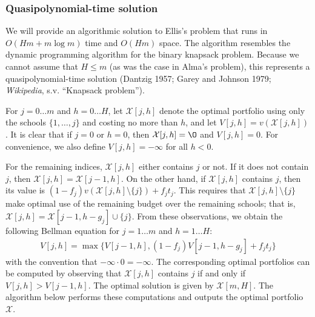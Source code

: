 \documentclass[12pt]{article} %
\theoremstyle{definition}
\theoremstyle{definition}
\begin{document}
\subsubsection{Quasipolynomial-time solution}
We will provide an algorithmic solution to Ellis's problem that runs in $O(Hm + m\log m)$ time and $O(Hm)$ space. The algorithm resembles the dynamic programming algorithm for the binary knapsack problem. Because we cannot assume that $H \leq m$ (as was the case in Alma's problem), this represents a quasipolynomial-time solution (Dantzig 1957; Garey and Johnson 1979; \emph{Wikipedia}, s.v. ``Knapsack problem'').

For $j = 0 \dots m$ and $h = 0 \dots H$, let $\mathcal{X}[j, h]$ denote the optimal portfolio using only the schools $\{ 1, \dots, j\}$ and costing no more than $h$, and let $V[j,h] = v(\mathcal{X}[j, h])$.  It is clear that if $j=0$ or $h=0$, then $\mathcal{X}[j, h] = \O$ and $V[j, h] = 0$.  For convenience, we also define $V[j, h] = -\infty$ for all $h < 0$.

For the remaining indices, $\mathcal{X}[j, h]$ either contains $j$ or not. If it does not contain $j$, then $\mathcal{X}[j, h] = \mathcal{X}[j-1, h]$. On the other hand, if  $\mathcal{X}[j, h]$ contains $j$, then its value is $(1 - f_j) v(\mathcal{X}[j, h]\setminus \{j\}) + f_j t_j$. This requires that $\mathcal{X}[j, h]\setminus \{j\}$ make optimal use of the remaining budget over the remaining schools; that is, $\mathcal{X}[j, h] = \mathcal{X}[j-1, h - g_j] \cup\{j\}$. From these observations, we obtain the following Bellman equation for $ j = 1\dots m$ and $h = 1\dots H$:
\begin{align}
V[j, h] = \max\bigl\{ V[j-1, h], (1 - f_j) V[j-1, h-g_j] + f_j t_j \bigr\}
\end{align}
with the convention that $ -\infty \cdot 0 = -\infty$. The corresponding optimal portfolios can be computed by observing that $\mathcal{X}[j, h]$ contains $j$ if and only if $V[j, h]> V[j-1, h]$. The optimal solution is given by $\mathcal{X}[m, H]$. The algorithm below performs these computations and outputs the optimal portfolio $\mathcal{X}$. 
\end{document}
